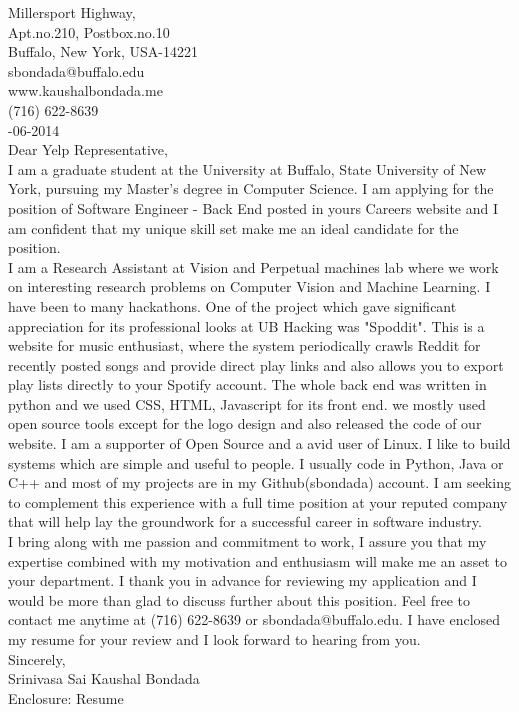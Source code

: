 \documentclass[10pt,letterpaper,oneside]{article} \usepackage[letterpaper,left=1in,right=1in,top=1in,bottom=1in]{geometry}
\begin{document}
 Millersport Highway,\\
Apt.no.210, Postbox.no.10\\
Buffalo, New York, USA-14221\\
sbondada@buffalo.edu\\
www.kaushalbondada.me\\
(716) 622-8639\\

-06-2014\\
 
\noindent Dear Yelp Representative,\\
 
I am a graduate student at the University at Buffalo, State University of New York, pursuing my Master's degree in Computer Science. I am
applying for the position of Software Engineer - Back End posted in yours Careers website and I am confident that my unique skill set make me an ideal candidate for the position.\\

I am a Research Assistant at Vision and Perpetual machines lab where we work on interesting research problems on Computer Vision and Machine
Learning. I have been to many hackathons. One of the project which gave significant appreciation for its professional looks
at UB Hacking was "Spoddit". This is a website for music enthusiast, where the system periodically crawls Reddit for 
recently posted songs and provide direct play links and also allows you to export play lists directly to your Spotify account. The whole back end was 
written in python and we used CSS, HTML, Javascript for its front end. we mostly used open source tools except for the logo design and also
released the code of our website. I am a supporter of Open Source and a avid user of Linux. I like to build systems which are simple and
useful to people. 
I usually code in Python, Java or C++ and most of my projects are in my Github(sbondada) account. 
I am seeking to complement this experience with a full time position at your reputed company that will help lay the groundwork for a successful career in software industry.\\

I bring along with me passion and commitment to work, I assure you that my expertise combined with my motivation and enthusiasm will make me an asset to your department. I thank you in advance for reviewing my application and I would be more than glad to discuss further about this position. Feel free to contact me anytime at (716) 622-8639 or sbondada@buffalo.edu. I have enclosed my resume for your review and I look forward to hearing from you.\\
 
\noindent Sincerely,\\
Srinivasa Sai Kaushal Bondada\\
Enclosure: Resume\\
\end{document}
